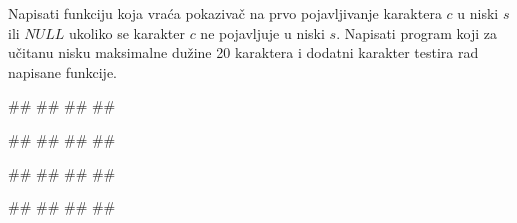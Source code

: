 

\begin{Exercise}[label=p2.3_09] 
Napisati funkciju  koja vraća pokazivač na prvo pojavljivanje karaktera $c$ u niski $s$ ili $NULL$ ukoliko se karakter $c$ ne pojavljuje u niski $s$. Napisati program koji za učitanu nisku maksimalne dužine 20 karaktera i dodatni karakter testira rad napisane funkcije.

\begin{miditest}
\begin{upotreba}{1}
#\naslovInt#
##
##
##
\end{upotreba}
\end{miditest}
\begin{miditest}
\begin{upotreba}{2}
#\naslovInt#
##
##
##
\end{upotreba}
\end{miditest}

\begin{miditest}
\begin{upotreba}{3}
#\naslovInt#
##
##
##
\end{upotreba}
\end{miditest}
\begin{miditest}
\begin{upotreba}{4}
#\naslovInt#
##
##
##
\end{upotreba}
\end{miditest}

\end{Exercise}
\ifresenja
\begin{Answer}[ref=p2.3_09]
\end{Answer}
\fi

